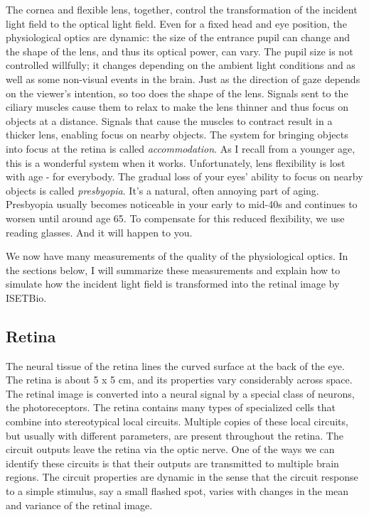 \documentclass[
  letterpaper,
]{book}
\begin{document}
The cornea and flexible lens, together, control the transformation of
the incident light field to the optical light field. Even for a fixed
head and eye position, the physiological optics are dynamic: the size of
the entrance pupil can change and the shape of the lens, and thus its
optical power, can vary. The pupil size is not controlled willfully; it
changes depending on the ambient light conditions and as well as some
non-visual events in the brain. Just as the direction of gaze depends on
the viewer's intention, so too does the shape of the lens. Signals sent
to the ciliary muscles cause them to relax to make the lens thinner and
thus focus on objects at a distance. Signals that cause the muscles to
contract result in a thicker lens, enabling focus on nearby objects. The
system for bringing objects into focus at the retina is called
\emph{accommodation}. As I recall from a younger age, this is a
wonderful system when it works. Unfortunately, lens flexibility is lost
with age - for everybody. The gradual loss of your eyes' ability to
focus on nearby objects is called \emph{presbyopia}. It's a natural,
often annoying part of aging. Presbyopia usually becomes noticeable in
your early to mid-40s and continues to worsen until around age 65. To
compensate for this reduced flexibility, we use reading glasses. And it
will happen to you.

We now have many measurements of the quality of the physiological
optics. In the sections below, I will summarize these measurements and
explain how to simulate how the incident light field is transformed into
the retinal image by ISETBio.

\subsection{Retina}\label{retina}

The neural tissue of the retina lines the curved surface at the back of
the eye. The retina is about 5 x 5 cm, and its properties vary
considerably across space. The retinal image is converted into a neural
signal by a special class of neurons, the photoreceptors. The retina
contains many types of specialized cells that combine into stereotypical
local circuits. Multiple copies of these local circuits, but usually
with different parameters, are present throughout the retina. The
circuit outputs leave the retina via the optic nerve. One of the ways we
can identify these circuits is that their outputs are transmitted to
multiple brain regions. The circuit properties are dynamic in the sense
that the circuit response to a simple stimulus, say a small flashed
spot, varies with changes in the mean and variance of the retinal image.
\end{document}
